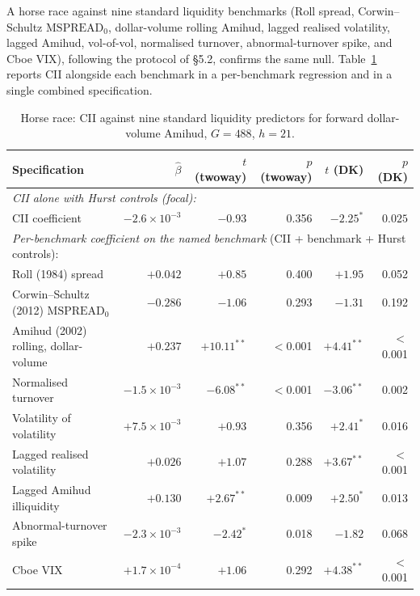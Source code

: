 \documentclass[preprint,12pt,authoryear]{elsarticle}
\begin{document}
A horse race against nine standard liquidity benchmarks (Roll spread, Corwin--Schultz $\mathrm{MSPREAD}_{0}$, dollar-volume rolling Amihud, lagged realised volatility, lagged Amihud, vol-of-vol, normalised turnover, abnormal-turnover spike, and Cboe VIX), following the protocol of \citet{goyenko2009liquidity} \S5.2, confirms the same null. Table~\ref{tab:horserace} reports CII alongside each benchmark in a per-benchmark regression and in a single combined specification.

\begin{table}[H]
\centering
\begin{threeparttable}
\caption{Horse race: CII against nine standard liquidity predictors for forward dollar-volume Amihud, $G = 488$, $h = 21$.}
\label{tab:horserace}
\begin{tabular}{lrrrrr}
\toprule
Specification & $\hat{\beta}$ & $t$ (twoway) & $p$ (twoway) & $t$ (DK) & $p$ (DK) \\
\midrule
\multicolumn{6}{l}{\emph{CII alone with Hurst controls (focal):}} \\
\quad CII coefficient & $-2.6 \times 10^{-3}$ & $-0.93$ & 0.356 & $\mathbf{-2.25^{*}}$ & $\mathbf{0.025}$ \\
\midrule
\multicolumn{6}{l}{\emph{Per-benchmark coefficient on the named benchmark} (CII + benchmark + Hurst controls):} \\
\quad Roll (1984) spread & $+0.042$ & $+0.85$ & 0.400 & $+1.95$ & 0.052 \\
\quad Corwin--Schultz (2012) $\mathrm{MSPREAD}_{0}$ & $-0.286$ & $-1.06$ & 0.293 & $-1.31$ & 0.192 \\
\quad Amihud (2002) rolling, dollar-volume & $+0.237$ & $\mathbf{+10.11^{**}}$ & $<$0.001 & $\mathbf{+4.41^{**}}$ & $<$0.001 \\
\quad Normalised turnover & $-1.5 \times 10^{-3}$ & $\mathbf{-6.08^{**}}$ & $<$0.001 & $\mathbf{-3.06^{**}}$ & 0.002 \\
\quad Volatility of volatility & $+7.5 \times 10^{-3}$ & $+0.93$ & 0.356 & $\mathbf{+2.41^{*}}$ & 0.016 \\
\quad Lagged realised volatility & $+0.026$ & $+1.07$ & 0.288 & $\mathbf{+3.67^{**}}$ & $<$0.001 \\
\quad Lagged Amihud illiquidity & $+0.130$ & $\mathbf{+2.67^{**}}$ & 0.009 & $\mathbf{+2.50^{*}}$ & 0.013 \\
\quad Abnormal-turnover spike & $-2.3 \times 10^{-3}$ & $\mathbf{-2.42^{*}}$ & 0.018 & $-1.82$ & 0.068 \\
\quad Cboe VIX & $+1.7 \times 10^{-4}$ & $+1.06$ & 0.292 & $\mathbf{+4.38^{**}}$ & $<$0.001 \\

\end{tabular}
\end{threeparttable}
\end{table}
\end{document}
